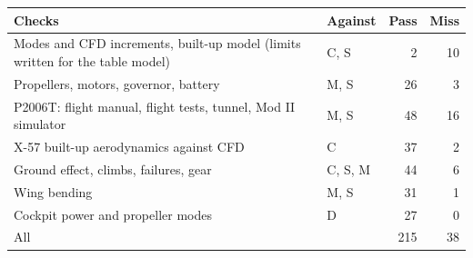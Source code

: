 \begin{tabular}{@{}p{50mm}lrr@{}}
\toprule
Checks & Against & Pass & Miss\\
\midrule
Modes and CFD increments, built-up model (limits written for the table model) & C, S & 2 & 10\\
Propellers, motors, governor, battery & M, S & 26 & 3\\
P2006T: flight manual, flight tests, tunnel, Mod II simulator & M, S & 48 & 16\\
X-57 built-up aerodynamics against CFD & C & 37 & 2\\
Ground effect, climbs, failures, gear & C, S, M & 44 & 6\\
Wing bending & M, S & 31 & 1\\
Cockpit power and propeller modes & D & 27 & 0\\
\midrule
All & & 215 & 38\\
\bottomrule
\end{tabular}
